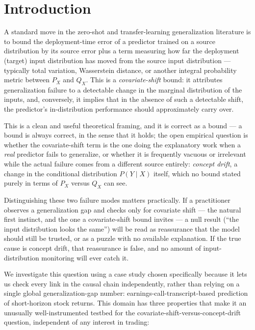 \documentclass[11pt]{article}
\begin{document}
\begin{abstract}
protocol used here as a general, reusable diagnostic for telling the two failure modes apart.
\end{abstract}

\section{Introduction}

A standard move in the zero-shot and transfer-learning generalization literature is to bound the deployment-time error of a predictor trained on a source distribution by its source error plus a term measuring how far the deployment (target) input distribution has moved from the source input distribution --- typically total variation, Wasserstein distance, or another integral probability metric between $P_X$ and $Q_X$. This is a \emph{covariate-shift} bound: it attributes generalization failure to a detectable change in the marginal distribution of the inputs, and, conversely, it implies that in the absence of such a detectable shift, the predictor's in-distribution performance should approximately carry over.

This is a clean and useful theoretical framing, and it is correct as a bound --- a bound is always correct, in the sense that it holds; the open empirical question is whether the covariate-shift term is the one doing the explanatory work when a \emph{real} predictor fails to generalize, or whether it is frequently vacuous or irrelevant while the actual failure comes from a different source entirely: \emph{concept drift}, a change in the conditional distribution $P(Y\mid X)$ itself, which no bound stated purely in terms of $P_X$ versus $Q_X$ can see.

Distinguishing these two failure modes matters practically. If a practitioner observes a generalization gap and checks only for covariate shift --- the natural first instinct, and the one a covariate-shift bound invites --- a null result (``the input distribution looks the same'') will be read as reassurance that the model should still be trusted, or as a puzzle with no available explanation. If the true cause is concept drift, that reassurance is false, and no amount of input-distribution monitoring will ever catch it.

We investigate this question using a case study chosen specifically because it lets us check every link in the causal chain independently, rather than relying on a single global generalization-gap number: earnings-call-transcript-based prediction of short-horizon stock returns. This domain has three properties that make it an unusually well-instrumented testbed for the covariate-shift-versus-concept-drift question, independent of any interest in trading:
\end{document}
